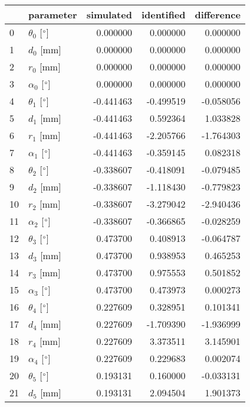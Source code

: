 \documentclass{standalone}%
\begin{document}
%
\normalsize%
\begin{tabular}{llrrr}
\toprule
{} &                 parameter & simulated & identified & difference \\
\midrule
0  &  $\theta_{0}$ [$\degree$] &  0.000000 &   0.000000 &   0.000000 \\
1  &              $d_{0}$ [mm] &  0.000000 &   0.000000 &   0.000000 \\
2  &              $r_{0}$ [mm] &  0.000000 &   0.000000 &   0.000000 \\
3  &  $\alpha_{0}$ [$\degree$] &  0.000000 &   0.000000 &   0.000000 \\
4  &  $\theta_{1}$ [$\degree$] & -0.441463 &  -0.499519 &  -0.058056 \\
5  &              $d_{1}$ [mm] & -0.441463 &   0.592364 &   1.033828 \\
6  &              $r_{1}$ [mm] & -0.441463 &  -2.205766 &  -1.764303 \\
7  &  $\alpha_{1}$ [$\degree$] & -0.441463 &  -0.359145 &   0.082318 \\
8  &  $\theta_{2}$ [$\degree$] & -0.338607 &  -0.418091 &  -0.079485 \\
9  &              $d_{2}$ [mm] & -0.338607 &  -1.118430 &  -0.779823 \\
10 &              $r_{2}$ [mm] & -0.338607 &  -3.279042 &  -2.940436 \\
11 &  $\alpha_{2}$ [$\degree$] & -0.338607 &  -0.366865 &  -0.028259 \\
12 &  $\theta_{3}$ [$\degree$] &  0.473700 &   0.408913 &  -0.064787 \\
13 &              $d_{3}$ [mm] &  0.473700 &   0.938953 &   0.465253 \\
14 &              $r_{3}$ [mm] &  0.473700 &   0.975553 &   0.501852 \\
15 &  $\alpha_{3}$ [$\degree$] &  0.473700 &   0.473973 &   0.000273 \\
16 &  $\theta_{4}$ [$\degree$] &  0.227609 &   0.328951 &   0.101341 \\
17 &              $d_{4}$ [mm] &  0.227609 &  -1.709390 &  -1.936999 \\
18 &              $r_{4}$ [mm] &  0.227609 &   3.373511 &   3.145901 \\
19 &  $\alpha_{4}$ [$\degree$] &  0.227609 &   0.229683 &   0.002074 \\
20 &  $\theta_{5}$ [$\degree$] &  0.193131 &   0.160000 &  -0.033131 \\
21 &              $d_{5}$ [mm] &  0.193131 &   2.094504 &   1.901373 \\

\end{tabular}
\end{document}
